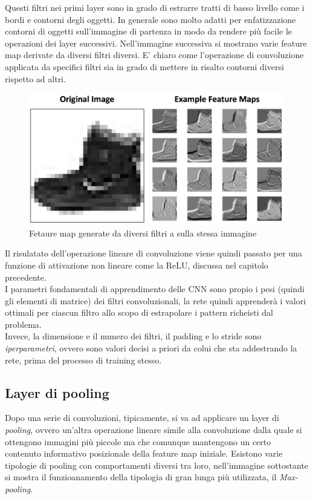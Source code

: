 \documentclass[12pt,a4paper,openright,twoside]{report}
\begin{document}
Questi filtri nei primi layer sono in grado di estrarre tratti di basso livello come i bordi e contorni degli oggetti. In generale sono molto adatti per enfatizzazione contorni di oggetti sull'immagine di partenza in modo da rendere più facile le operazioni dei layer successivi.
Nell'immagine successiva si mostrano varie feature map derivate da diversi filtri diversi. E' chiaro come l'operazione di convoluzione applicata da specifici filtri sia in grado di mettere in risalto contorni diversi rispetto ad altri.
\begin{figure}[h]
\centering
\includegraphics[width=\linewidth]{fetaureMaps.png}
\caption{Fetaure map generate da diversi filtri a sulla stessa immagine}
\end{figure}
Il risulatato dell'operazione lineare di convoluzione viene quindi passato per una funzione di attivazione non lineare come la ReLU, discussa nel capitolo precedente.\\

I parametri fondamentali di apprendimento delle CNN sono propio i pesi (quindi gli elementi di matrice) dei filtri convoluzionali, la rete quindi apprenderà i valori ottimali per ciascun filtro allo scopo di estrapolare i pattern richeisti dal problema.
\\
Invece, la dimensione e il numero dei filtri, il padding e lo stride sono \emph{iperparametri}, ovvero sono valori decisi a priori da colui che sta addestrando la rete, prima del processo di training stesso. 
\newpage
\subsection{Layer di pooling}
Dopo una serie di convoluzioni, tipicamente, si va ad applicare un layer di \emph{pooling}, ovvero un'altra operazione lineare simile alla convoluzione dalla quale si ottengono immagini più piccole ma che comunque mantengono un certo contenuto informativo posizionale della feature map iniziale.
Esistono varie tipologie di pooling con comportamenti diversi tra loro, nell'immagine sottostante si mostra il funzioanamento della tipologia di gran lunga più utilizzata, il \emph{Max-pooling}.
\end{document}
